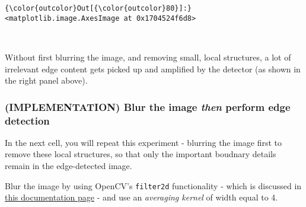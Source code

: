 \documentclass[11pt]{article}
\begin{document}
\begin{Verbatim}[commandchars=\\\{\}]
{\color{outcolor}Out[{\color{outcolor}80}]:} <matplotlib.image.AxesImage at 0x1704524f6d8>
\end{Verbatim}
            
    \begin{center}
    \end{center}
    { \hspace*{\fill} \\}
    
    Without first blurring the image, and removing small, local structures,
a lot of irrelevant edge content gets picked up and amplified by the
detector (as shown in the right panel above).

    \subsubsection{\texorpdfstring{(IMPLEMENTATION) Blur the image
\emph{then} perform edge
detection}{(IMPLEMENTATION) Blur the image then perform edge detection}}\label{implementation-blur-the-image-then-perform-edge-detection}

In the next cell, you will repeat this experiment - blurring the image
first to remove these local structures, so that only the important
boudnary details remain in the edge-detected image.

Blur the image by using OpenCV's \texttt{filter2d} functionality - which
is discussed in
\href{http://docs.opencv.org/3.1.0/d4/d13/tutorial_py_filtering.html}{this
documentation page} - and use an \emph{averaging kernel} of width equal
to 4.
\end{document}
